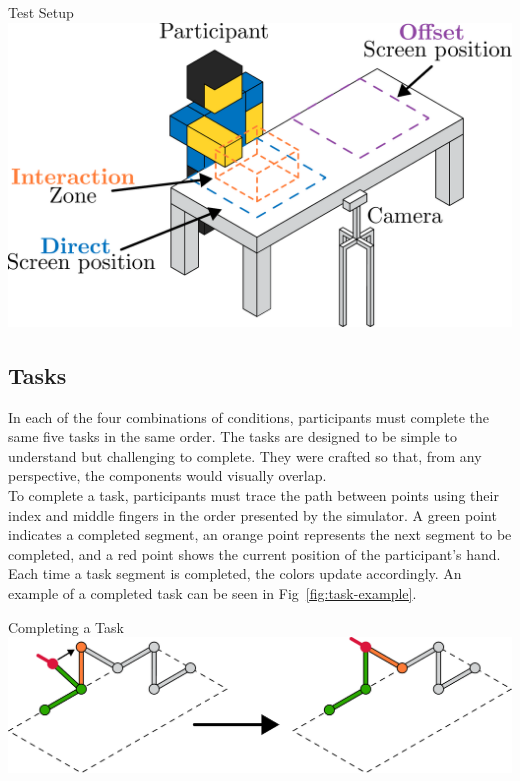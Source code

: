 \begin{figureBox}[label={fig:test-setup}, width=0.8\linewidth]{Test Setup}
    \includegraphics[width=0.8\linewidth]{./implementation/figures/test-setup.pdf}
\end{figureBox}

\subsection{Tasks}
In each of the four combinations of conditions, participants must complete the same five tasks in the same order. The tasks are designed to be simple to understand but challenging to complete. They were crafted so that, from any perspective, the components would visually overlap. \\

To complete a task, participants must trace the path between points using their index and middle fingers in the order presented by the simulator. A green point indicates a completed segment, an orange point represents the next segment to be completed, and a red point shows the current position of the participant's hand. Each time a task segment is completed, the colors update accordingly. An example of a completed task can be seen in Fig~\ref{fig:task-example}.

\begin{figureBox}[label={fig:task-example}, width=0.8\linewidth]{Completing a Task}
    \includegraphics[width=0.8\linewidth]{./implementation/figures/task-example.pdf}
\end{figureBox}

